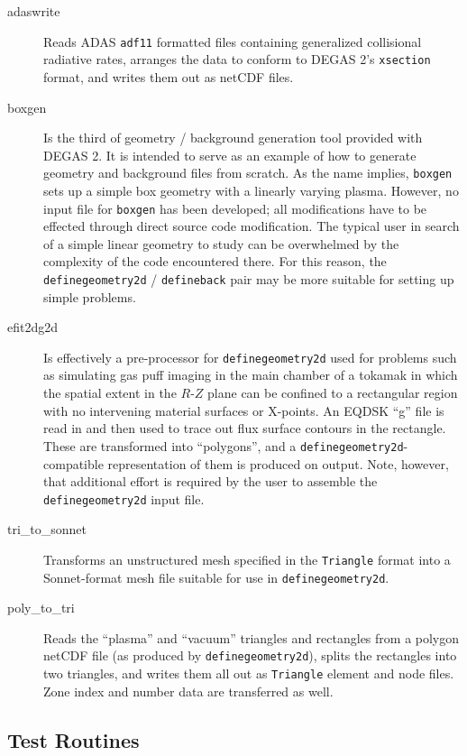 \documentclass[12pt]{report}
\begin{document}
\begin{description}
\item[adaswrite] Reads ADAS {\tt adf11} \cite{ADAS} 
formatted files containing generalized
collisional radiative rates, arranges the data to conform to DEGAS 2's 
{\tt xsection} format, and writes them out as netCDF files.
\item[boxgen] Is the third of geometry / background generation tool provided 
with DEGAS 2.  It is intended to serve as an example of how to generate
geometry and background files from scratch. As the name implies, {\tt boxgen}
sets up a simple box geometry with a linearly varying plasma. However, 
no input file for {\tt boxgen} has been developed; all modifications have to
be effected through direct source code modification. The typical user
in search of a simple linear geometry to study can be overwhelmed by the
complexity of the code encountered there. For this reason, the 
{\tt definegeometry2d} / {\tt defineback} pair may be more suitable for
setting up simple problems.
\item[efit2dg2d] Is effectively a pre-processor for {\tt definegeometry2d}
used for problems such as simulating gas puff imaging in the main chamber
of a tokamak in which the spatial extent in the $R$-$Z$ plane can be
confined to a rectangular region with no intervening material surfaces
or X-points.  An EQDSK ``g'' file is read in and then used to trace out
flux surface contours in the rectangle.  These are transformed into 
``polygons'', and a {\tt definegeometry2d}-compatible representation
of them is produced on output.  Note, however, that additional effort
is required by the user to assemble the {\tt definegeometry2d} input
file.
\item[tri\_to\_sonnet] Transforms an unstructured mesh specified in
the {\tt Triangle} format into a Sonnet-format mesh file suitable for
use in {\tt definegeometry2d}.
\item[poly\_to\_tri] Reads the ``plasma'' and ``vacuum''
triangles and rectangles from a polygon netCDF file (as produced by
{\tt definegeometry2d}), splits the rectangles into two triangles,
and writes them all out as {\tt Triangle} element and node files.
Zone index and number data are transferred as well.
\end{description}

\subsection{Test Routines}
\label{testroutines}
\end{document}
